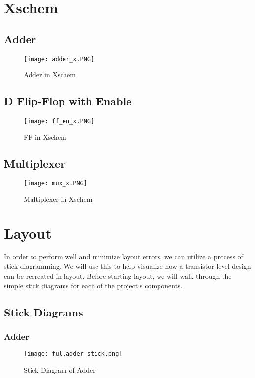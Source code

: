 \documentclass{article}
\begin{document}
\section{Xschem}
\subsection{Adder}
\begin{figure}[H]
    \centering
    \texttt{[image: adder\_x.PNG]}
    \caption{Adder in Xschem}
    \label{fig:add_x}
\end{figure}

\subsection{D Flip-Flop with Enable}
\begin{figure}[H]
    \centering
    \texttt{[image: ff\_en\_x.PNG]}
    \caption{FF in Xschem}
    \label{fig:ff_en_x}
\end{figure}

\subsection{Multiplexer}
\begin{figure}[H]
    \centering
    \texttt{[image: mux\_x.PNG]}
    \caption{Multiplexer in Xschem}
    \label{fig:mult_x}
\end{figure}

\section{Layout}
In order to perform well and minimize layout errors, we can utilize a process of stick diagramming. We will use this to help visualize how a transistor level design can be recreated in layout. Before starting layout, we will walk through the simple stick diagrams for each of the project's components.
\subsection{Stick Diagrams}

\subsubsection{Adder}

\begin{figure}[H]
    \centering
    \texttt{[image: fulladder\_stick.png]}
    \caption{Stick Diagram of Adder}
    \label{fig:adder_stick}
\end{figure}
\end{document}
